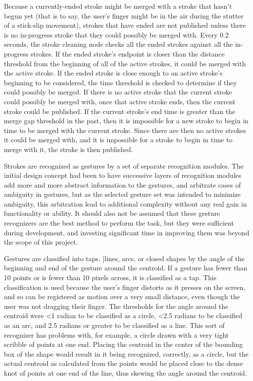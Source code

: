 Because a currently-ended stroke might be merged with a stroke that hasn't begun yet (that is to say, the user's finger might be in the air during the stutter of a stick-slip movement), strokes that have ended are not published unless there is no in-progress stroke that they could possibly be merged with. 
Every 0.2 seconds, the stroke cleaning node checks all the ended strokes against all the in-progress strokes. 
If the ended stroke's endpoint is closer than the distance threshold from the beginning of all of the active strokes, it could be merged with the active stroke. 
If the ended stroke is close enough to an active stroke's beginning to be considered, the time threshold is checked to determine if they could possibly be merged. 
If there is no active stroke that the current stroke could possibly be merged with, once that active stroke ends, then the current stroke could be published.
If the current stroke's end time is greater than the merge gap threshold in the past, then it is impossible for a new stroke to begin in time to be merged with the current stroke. 
Since there are then no active strokes it could be merged with, and it is impossible for a stroke to begin in time to merge with it, the stroke is then published. 

Strokes are recognized as gestures by a set of separate recognition modules. 
The initial design concept had been to have successive layers of recognition modules add more and more abstract information to the gestures, and arbitrate cases of ambiguity in gestures, but as the selected gesture set was intended to minimize ambiguity, this arbitration lead to additional complexity without any real gain in functionality or ability. 
It should also not be assumed that these gesture recognizers are the best method to perform the task, but they were sufficient during development, and investing significant time in improving them was beyond the scope of this project. 

Gestures are classified into taps, ]lines, arcs, or closed shapes by the angle of the beginning and end of the gesture around the centroid. 
If a gesture has fewer than 10 points or is fewer than 10 pixels across, it is classified as a tap. 
This classification is used because the user's finger distorts as it presses on the screen, and so can be registered as motion over a very small distance, even though the user was not dragging their finger. 
The thresholds for the angle around the centroid were \textless 1 radian to be classified as a circle, \textless 2.5 radians to be classified as an arc, and 2.5 radians or greater to be classified as a line. 
This sort of recognizer has problems with, for example, a circle drawn with a very tight scribble of points at one end. Placing the centroid in the center of the bounding box of the shape would result in it being recognized, correctly, as a circle, but the actual centroid as calculated from the points would be placed close to the dense knot of points at one end of the line, thus skewing the angle around the centroid. 

